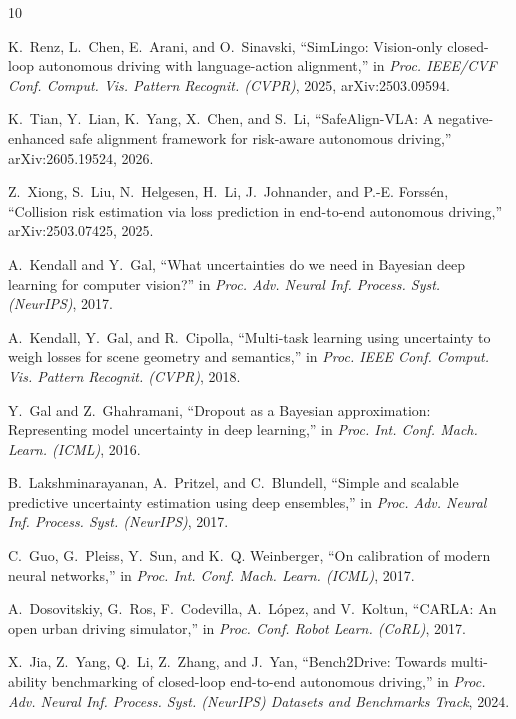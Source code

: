\documentclass[conference]{IEEEtran}
\begin{document}
\begin{thebibliography}{10}

K.~Renz, L.~Chen, E.~Arani, and O.~Sinavski, ``SimLingo: Vision-only closed-loop
autonomous driving with language-action alignment,'' in \emph{Proc. IEEE/CVF Conf.
Comput. Vis. Pattern Recognit. (CVPR)}, 2025, arXiv:2503.09594.

K.~Tian, Y.~Lian, K.~Yang, X.~Chen, and S.~Li, ``SafeAlign-VLA: A negative-enhanced
safe alignment framework for risk-aware autonomous driving,'' arXiv:2605.19524,
2026.

Z.~Xiong, S.~Liu, N.~Helgesen, H.~Li, J.~Johnander, and P.-E. Forss\'en,
``Collision risk estimation via loss prediction in end-to-end autonomous driving,''
arXiv:2503.07425, 2025.

A.~Kendall and Y.~Gal, ``What uncertainties do we need in Bayesian deep learning for
computer vision?'' in \emph{Proc. Adv. Neural Inf. Process. Syst. (NeurIPS)}, 2017.

A.~Kendall, Y.~Gal, and R.~Cipolla, ``Multi-task learning using uncertainty to weigh
losses for scene geometry and semantics,'' in \emph{Proc. IEEE Conf. Comput. Vis.
Pattern Recognit. (CVPR)}, 2018.

Y.~Gal and Z.~Ghahramani, ``Dropout as a Bayesian approximation: Representing model
uncertainty in deep learning,'' in \emph{Proc. Int. Conf. Mach. Learn. (ICML)},
2016.

B.~Lakshminarayanan, A.~Pritzel, and C.~Blundell, ``Simple and scalable predictive
uncertainty estimation using deep ensembles,'' in \emph{Proc. Adv. Neural Inf.
Process. Syst. (NeurIPS)}, 2017.

C.~Guo, G.~Pleiss, Y.~Sun, and K.~Q. Weinberger, ``On calibration of modern neural
networks,'' in \emph{Proc. Int. Conf. Mach. Learn. (ICML)}, 2017.

A.~Dosovitskiy, G.~Ros, F.~Codevilla, A.~L\'opez, and V.~Koltun, ``CARLA: An open
urban driving simulator,'' in \emph{Proc. Conf. Robot Learn. (CoRL)}, 2017.

X.~Jia, Z.~Yang, Q.~Li, Z.~Zhang, and J.~Yan, ``Bench2Drive: Towards multi-ability
benchmarking of closed-loop end-to-end autonomous driving,'' in \emph{Proc. Adv.
Neural Inf. Process. Syst. (NeurIPS) Datasets and Benchmarks Track}, 2024.

\end{thebibliography}
\end{document}
